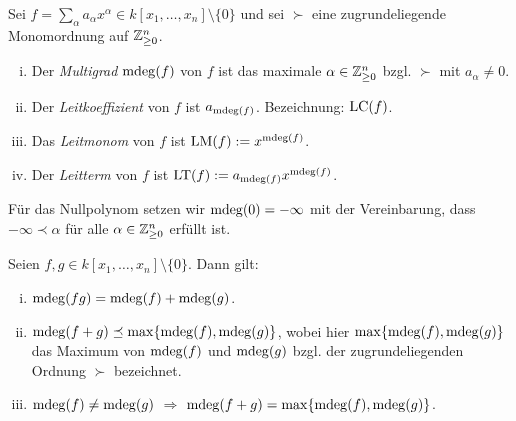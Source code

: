 \documentclass[11pt]{article}
\numberwithin{equation}{section}
\begin{document}
\begin{definition} 
	Sei $f = \sum_\alpha a_\alpha x^\alpha \in k[x_1,\ldots,x_n] \setminus \{0\}$ und sei $\succ$ eine zugrundeliegende Monomordnung auf $\mathbb{Z}_{\ge 0}^n$. 
	\begin{enumerate}[(i)]
		\item Der \emph{Multigrad} $\operatorname{mdeg}(f)$ von $f$ ist das maximale $\alpha \in \mathbb{Z}_{\ge 0}^n$ bzgl. $\succ$ mit $a_\alpha \ne 0$. 
		\item Der \emph{Leitkoeffizient} von $f$ ist $a_{\operatorname{mdeg}(f)}$. Bezeichnung: $\operatorname{LC}(f)$.
		\item Das \emph{Leitmonom} von $f$ ist $\operatorname{LM}(f) := x^{\operatorname{mdeg}(f)}$. 
		\item Der \emph{Leitterm} von $f$ ist $\operatorname{LT}(f) := a_{\operatorname{mdeg}(f)} x^{\operatorname{mdeg}(f)}$. 
	\end{enumerate} 
	Für das Nullpolynom setzen wir $\operatorname{mdeg}(0) = -\infty$ mit der Vereinbarung, dass $-\infty \prec \alpha$ für alle $\alpha \in \mathbb{Z}_{\ge 0}^n$ erfüllt ist. 
\end{definition} 

\begin{lemma} 
	Seien $f,g \in k[x_1,\ldots,x_n] \setminus \{0\}$.
	Dann gilt: 
	\begin{enumerate}[(i)]
		\item $\operatorname{mdeg}(f g) = \operatorname{mdeg}(f) + \operatorname{mdeg}(g)$. 
		\item $\operatorname{mdeg}(f+g) \preceq \max \{ \operatorname{mdeg}(f), \operatorname{mdeg}(g) \}$, wobei hier $\max \{ \operatorname{mdeg}(f), \operatorname{mdeg}(g)\}$ das Maximum von $\operatorname{mdeg}(f)$ und $\operatorname{mdeg}(g)$ bzgl. der zugrundeliegenden Ordnung $\succ$ bezeichnet. 
		\item $\operatorname{mdeg}(f) \ne \operatorname{mdeg}(g)$ $\Rightarrow$ $\operatorname{mdeg}(f+g) = \max \{\operatorname{mdeg}(f), \operatorname{mdeg}(g) \}$. 
	\end{enumerate} 
\end{lemma} 



\end{document}
